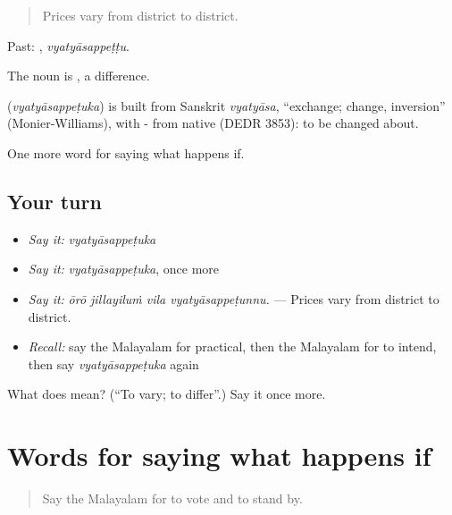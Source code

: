 \begin{quote}
Prices vary from district to district.
\end{quote}

Past: , \emph{vyatyāsappeṭṭu}.

The noun is , a difference.

\begin{cousinweb}
\textbf{} (\emph{vyatyāsappeṭuka}) is built from Sanskrit \emph{vyatyāsa}, \textquotedblleft{}exchange; change, inversion\textquotedblright{} (Monier-Williams), with - from native  (DEDR 3853): to be changed about.
\end{cousinweb}

\begin{grammarlens}[title={What you've built}]
One more word for saying what happens if.
\end{grammarlens}

\subsection*{Your turn}
\begin{itemize}
\raggedright
  \item \emph{Say it:} \emph{vyatyāsappeṭuka}
  \item \emph{Say it:} \emph{vyatyāsappeṭuka}, once more
  \item \emph{Say it:} \emph{ōrō jillayiluṁ vila vyatyāsappeṭunnu.} — Prices vary from district to district.
  \item \emph{Recall:} say the Malayalam for practical, then the Malayalam for to intend, then say \emph{vyatyāsappeṭuka} again
\end{itemize}

\begin{tcolorbox}[breakable,colback=teal!4,colframe=teal!35!black,title={Before you move on}]
What does  mean? (\textquotedblleft{}To vary; to differ\textquotedblright{}.) Say it once more.
\end{tcolorbox}
\section[(dialogue)]{Words for saying what happens if}

\label{lesson:ML-R460-review-453-460}



\begin{quote}
Say the Malayalam for to vote and to stand by.
\end{quote}

